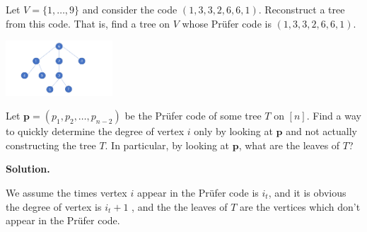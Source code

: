 \begin{exercise}
  Let $V = \{1,\dots,9\}$ and consider the code $(1,3,3,2,6,6,1)$. Reconstruct a tree
  from this code. That is, find a tree on $V$ whose Pr\"ufer code is $(1,3,3,2,6,6,1)$.
\end{exercise}
\begin{center}
\includegraphics[width=0.3\textwidth]{./figures/prufer1.jpeg}
\end{center}
\begin{exercise}
  Let $\mathbf{p} = (p_1,p_2,\dots,p_{n-2})$ be the Pr\"ufer  code of some tree $T$ on $[n]$.
  Find a way to quickly determine the degree of vertex $i$ only by looking
  at $\mathbf{p}$ and not actually constructing the tree $T$.
  In particular, by looking at $\mathbf{p}$, what are the leaves of $T$?
\end{exercise}
\textbf{Solution.}
\par We assume the times vertex $i$ appear in the Pr\"ufer code is $i_t$, and it is obvious the degree of vertex is $i_t+1$ , and the the leaves of $T$ are the vertices which don't appear in the Pr\"ufer code.


